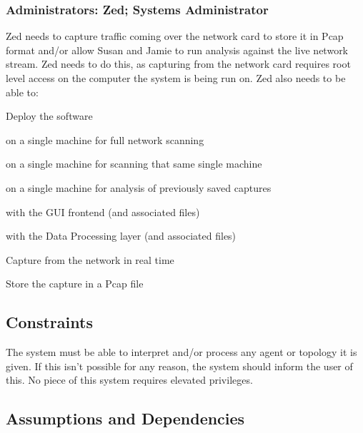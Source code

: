 \documentclass[titlepage]{article}
\begin{document}

\subsubsection{Administrators: Zed; Systems Administrator%
  \label{zed}%
}

Zed needs to capture traffic coming over the network card to store it in Pcap
format and/or allow Susan and Jamie to run analysis against the live network
stream.  Zed needs to do this, as capturing from the network card requires root
level access on the computer the system is being run on.  
%
Zed also needs to be able to:
\begin{itemize*}
    \item Deploy the software
    \begin{itemize*}
        \item on a single machine for full network scanning
        \item on a single machine for scanning that same single machine
        \item on a single machine for analysis of previously saved captures
        \item with the GUI frontend (and associated files)
        \item with the Data Processing layer (and associated files)
    \end{itemize*}
    \item Capture from the network in real time
    \item Store the capture in a Pcap file
\end{itemize*}

\subsection{Constraints%
  \label{constraints}%
}

The system must be able to interpret and/or process any agent or topology it is given.  If this isn't possible for any reason, the system should inform the user of this. No piece of this system requires elevated privileges.


\subsection{Assumptions and Dependencies%
  \label{assumptions-and-dependencies}%
}
\end{document}
